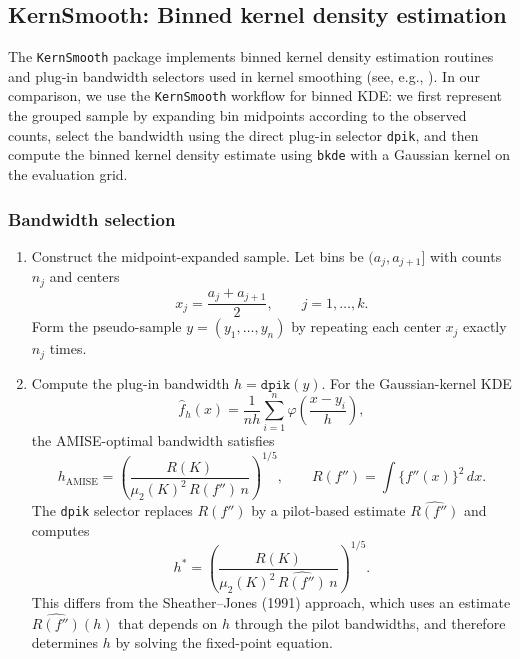 \documentclass[12pt]{article} %
\begin{document}
\subsection{KernSmooth: Binned kernel density estimation}

The \texttt{KernSmooth} \citep{KernSmoothPackage} package implements binned kernel density estimation routines and plug-in bandwidth selectors used in kernel smoothing (see, e.g., \cite{WandJones1995}). In our comparison, we use the \texttt{KernSmooth} workflow for binned KDE: we first represent the grouped sample by expanding bin midpoints according to the observed counts, select the bandwidth using the direct plug-in selector \texttt{dpik}, and then compute the binned kernel density estimate using \texttt{bkde} with a Gaussian kernel on the evaluation grid.

\subsubsection*{Bandwidth selection}
\begin{enumerate}
\item Construct the midpoint-expanded sample. Let bins be $(a_j,a_{j+1}]$ with counts $n_j$ and centers
\[
x_j=\frac{a_j+a_{j+1}}{2},\qquad j=1,\ldots,k.
\]
Form the pseudo-sample $y=(y_1,\ldots,y_n)$ by repeating each center $x_j$ exactly $n_j$ times.
\item Compute the plug-in bandwidth $h=\texttt{dpik}(y)$. For the Gaussian-kernel KDE
\[
\hat f_h(x)=\frac{1}{nh}\sum_{i=1}^n \varphi\!\left(\frac{x-y_i}{h}\right),
\]
the AMISE-optimal bandwidth satisfies
\[
h_{\mathrm{AMISE}}
=\left(\frac{R(K)}{\mu_2(K)^2\,R(f'')\,n}\right)^{1/5},
\qquad 
R(f'')=\int \{f''(x)\}^2\,dx.
\]
The \texttt{dpik} selector replaces $R(f'')$ by a pilot-based estimate $\widehat{R(f'')}$ and computes
\[
h^*
=\left(\frac{R(K)}{\mu_2(K)^2\,\widehat{R(f'')}\,n}\right)^{1/5}.
\]
This differs from the Sheather--Jones (1991) approach, which uses an estimate $\widehat{R(f'')}(h)$ that depends on $h$ through the pilot bandwidths, and therefore determines $h$ by solving the fixed-point equation.

\end{enumerate}
\end{document}

